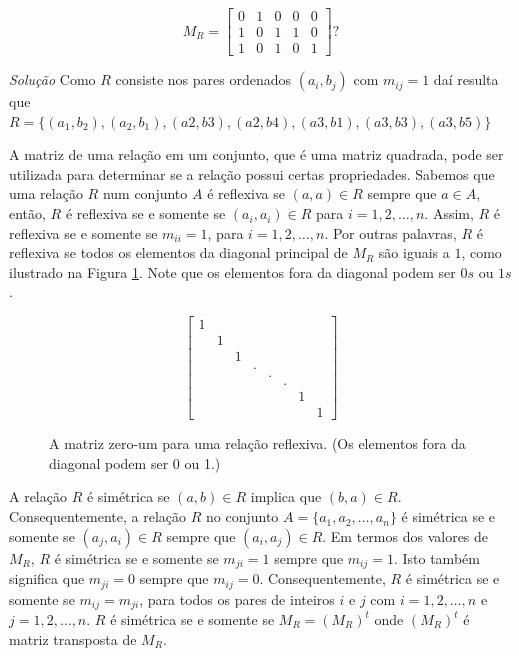 \[
	M_R = \begin{bmatrix}
	0 & 1 & 0 & 0 & 0\\
	1 & 0 & 1 & 1 & 0\\
	1 & 0 & 1 & 0 & 1
	\end{bmatrix}?
\]
	
\emph{Solução} Como $R$ consiste nos pares ordenados $(a_i, b_j)$ com $m_{ij} = 1$ daí resulta que
$R = \{(a_1,b_2), (a_2,b_1), (a2, b3), (a2, b4), (a3, b1), (a3, b3), (a3, b5)\}$

A matriz de uma relação em um conjunto, que é uma matriz quadrada, pode ser utilizada para determinar se a relação
possui certas propriedades. Sabemos que uma relação $R$ num conjunto $A$ é reflexiva se $(a,a) \in R$ sempre que
$a \in A$, então, $R$ é reflexiva se e somente se $(a_i, a_i) \in R$ para $i = 1,2,\ldots,n$. Assim, $R$ é reflexiva
se e somente se $m_{ii} = 1$, para $i = 1,2,\ldots,n$. Por outras palavras, $R$ é reflexiva se todos os elementos
da diagonal principal de $M_R$ são iguais a $1$, como ilustrado na Figura \ref{Figura61}. Note que os elementos fora da diagonal
podem ser $0s$ ou $1s$.

\begin{figure}[H]
	\centering
	\[
	\begin{bmatrix}
	 1	& 	& 	&	&	&	&	&\\
	 	& 1 &	&	&	&	&	&\\
		&	& 1 &	&	&	&	&\\
		&	&  	& .	&	&	&	&\\
		&	&	& 	& . &	&	&\\
		&	&	&	&	& . &	&\\
		&	&	& 	&	&	& 1	&\\
		&	&	&	&	&	&	& 1 
	\end{bmatrix}
	\]
	\caption{A matriz zero-um para uma relação reflexiva. (Os elementos fora da diagonal podem ser 0 ou 1.)}
	\label{Figura61}
\end{figure}

A relação $R$ é simétrica se $(a,b) \in R$ implica que $(b, a) \in R$. Consequentemente, a relação $R$ no conjunto
$A = \{a_1, a_2, \ldots, a_n\}$ é simétrica se e somente se $(a_j, a_i) \in R$ sempre que $(a_i, a_j) \in R$. Em termos
dos valores de $M_R$, $R$ é simétrica se e somente se $m_{ji} = 1$ sempre que $m_{ij} = 1$. Isto também significa que 
$m_{ji} = 0$ sempre que $m_{ij} = 0$. Consequentemente, $R$ é simétrica se e somente se $m_{ij} = m_{ji}$, para todos
os pares de inteiros $i$ e $j$ com $i = 1,2,\ldots,n$ e $j=1,2,\ldots,n$. $R$ é simétrica se e somente se $M_R = (M_R)^t$
onde $(M_R)^t$ é matriz transposta de $M_R$.


